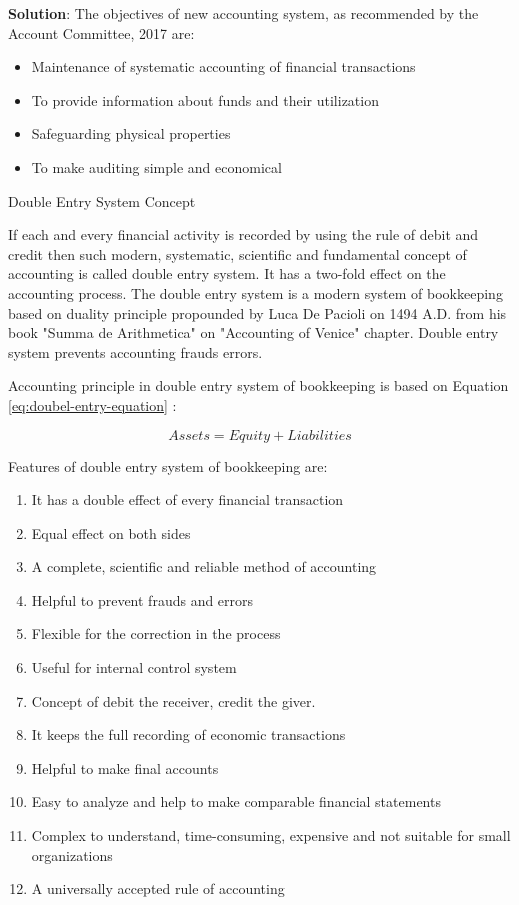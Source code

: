 \documentclass[
]{book}
\newenvironment{solution}{ {\bfseries Solution}:}{}
\begin{document}
\begin{questions}
\begin{solution}
The objectives of new accounting system, as recommended by the Account Committee, 2017 are:

\begin{itemize}
\item Maintenance of systematic accounting of financial transactions
\item To provide information about funds and their utilization
\item Safeguarding physical properties
\item To make auditing simple and economical
\end{itemize}

Double Entry System Concept

If each and every financial activity is recorded by using the rule of debit and credit then such modern, systematic, scientific and fundamental concept of accounting is called double entry system. It has a two-fold effect on the accounting process. The double entry system is a modern system of bookkeeping based on duality principle propounded by Luca De Pacioli on 1494 A.D. from his book "Summa de Arithmetica" on "Accounting of Venice" chapter. Double entry system prevents accounting frauds errors.

Accounting principle in double entry system of bookkeeping is based on Equation \ref{eq:doubel-entry-equation} :

\begin{equation}
Assets = Equity + Liabilities
\label{eq:double-entry-equation}
\end{equation}

Features of double entry system of bookkeeping are:

\begin{enumerate}
\item It has a double effect of every financial transaction
\item Equal effect on both sides
\item A complete, scientific and reliable method of accounting
\item Helpful to prevent frauds and errors
\item Flexible for the correction in the process
\item Useful for internal control system
\item Concept of debit the receiver, credit the giver.
\item It keeps the full recording of economic transactions
\item Helpful to make final accounts
\item Easy to analyze and help to make comparable financial statements
\item Complex to understand, time-consuming, expensive and not suitable for small organizations
\item A universally accepted rule of accounting
\end{enumerate}
\end{solution}


\end{questions}
\end{document}
